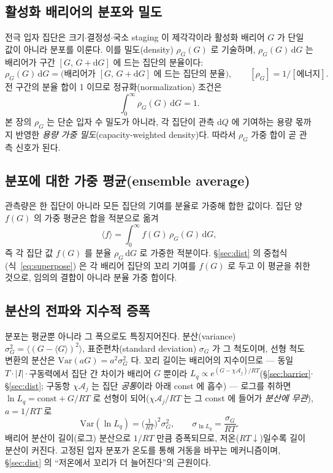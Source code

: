 \documentclass[11pt,a4paper]{article}
\newcommand{\dd}{\mathrm{d}}
\begin{document}
\subsection{활성화 배리어의 분포와 밀도}
전극 입자 집단은 크기$\cdot$결정성$\cdot$국소 staging 이 제각각이라 활성화 배리어 $G$ 가 단일 값이 아니라 분포를
이룬다. 이를 밀도(density) $\rho_G(G)$ 로 기술하며, $\rho_G(G)\,\dd G$ 는 배리어가 구간 $[G,\,G+\dd G]$ 에 드는
집단의 분율이다:
\begin{equation}
\rho_G(G)\,\dd G=\big(\text{배리어가 }[G,\,G+\dd G]\text{ 에 드는 집단의 분율}\big),\qquad [\rho_G]=1/[\text{에너지}].
\label{eq:density}
\end{equation}
전 구간의 분율 합이 1 이므로 정규화(normalization) 조건은
\begin{equation}
\int_0^\infty\rho_G(G)\,\dd G=1.
\label{eq:norm}
\end{equation}
본 장의 $\rho_G$ 는 단순 입자 수 밀도가 아니라, 각 집단이 관측 $\dd Q$ 에 기여하는 용량 몫까지 반영한 \emph{용량 가중 밀도}(capacity-weighted density)다.
따라서 $\rho_G$ 가중 합이 곧 관측 신호가 된다.

\subsection{분포에 대한 가중 평균(ensemble average)}
관측량은 한 집단이 아니라 모든 집단의 기여를 분율로 가중해 합한 값이다. 집단 양 $f(G)$ 의 가중 평균은 합을
적분으로 옮겨
\begin{equation}
\langle f\rangle=\int_0^\infty f(G)\,\rho_G(G)\,\dd G,
\label{eq:wavg}
\end{equation}
즉 각 집단 값 $f(G)$ 를 분율 $\rho_G\,\dd G$ 로 가중한 적분이다. \S\ref{sec:dist} 의 중첩식(식~\eqref{eq:superpose})
은 각 배리어 집단의 꼬리 기여를 $f(G)$ 로 두고 이 평균을 취한 것으로, 임의의 결합이 아니라 분율 가중 합이다.

\subsection{분산의 전파와 지수적 증폭}
분포는 평균뿐 아니라 그 폭으로도 특징지어진다. 분산(variance) $\sigma_G^2=\langle(G-\langle G\rangle)^2\rangle$,
표준편차(standard deviation) $\sigma_G$ 가 그 척도이며, 선형 척도 변환의 분산은 $\mathrm{Var}(aG)=a^2\sigma_G^2$ 다.
꼬리 길이는 배리어의 지수이므로 — 동일 $T\cdot|I|\cdot$구동력에서 집단 간 차이가 배리어 $G$ 뿐이라
$L_q\propto e^{(G-\chi\mathcal A_j)/RT}$(\S\ref{sec:barrier}$\cdot$\S\ref{sec:dist}; 구동항 $\chi\mathcal A_j$ 는 집단
\emph{공통}이라 아래 const 에 흡수) — 로그를 취하면 $\ln L_q=\text{const}+G/RT$ 로 선형이 되어($\chi\mathcal A_j/RT$
는 그 const 에 들어가 \emph{분산에 무관}), $a=1/RT$ 로
\begin{equation}
\mathrm{Var}(\ln L_q)=\Big(\tfrac{1}{RT}\Big)^2\sigma_G^2,\qquad \sigma_{\ln L_q}=\frac{\sigma_G}{RT}.
\label{eq:varprop}
\end{equation}
배리어 분산이 길이(로그) 분산으로 $1/RT$ 만큼 증폭되므로, 저온($RT\downarrow$)일수록 길이 분산이 커진다. 고정된
입자 분포가 온도를 통해 거동을 바꾸는 메커니즘이며, \S\ref{sec:dist} 의 ``저온에서 꼬리가 더 늘어진다''의 근원이다.
\end{document}
